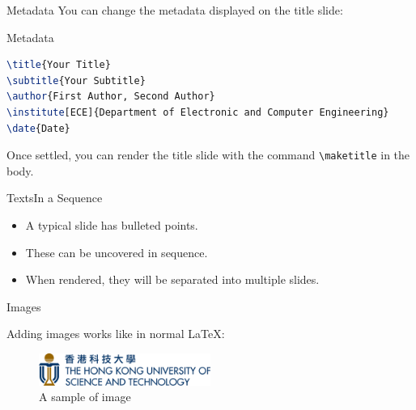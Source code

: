 \documentclass[10pt,aspectratio=169]{beamer}
\begin{document}
\begin{frame}[fragile]{Metadata}
	You can change the metadata displayed on the title slide:

\begin{block}{Metadata}
\begin{lstlisting}[language=TeX]
\title{Your Title}
\subtitle{Your Subtitle}
\author{First Author, Second Author}
\institute[ECE]{Department of Electronic and Computer Engineering}
\date{Date}
\end{lstlisting}
\end{block}

	Once settled, you can render the title slide with the command \verb|\maketitle| in the body.
\end{frame}

\begin{frame}[fragile]{Texts}{In a Sequence}

	\begin{itemize}[<+->]
		\item A typical slide has bulleted points.
		\item These can be uncovered in sequence.
		\item When rendered, they will be separated into multiple slides.
	\end{itemize}

\end{frame}

\begin{frame}{Images}

	Adding images works like in normal \LaTeX:
	
	\begin{figure}[hbt]
		\includegraphics[width=0.5\textwidth]{assets/template/logo-name.pdf}
 		\caption{A sample of image}
	\end{figure}
	
\end{frame}
\end{document}
